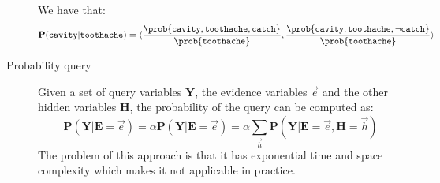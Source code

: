 \begin{description}
\begin{example}
            We have that:
            \[
                \textbf{P}(\texttt{cavity} \vert \texttt{toothache}) = 
                    \langle 
                        \frac{\prob{\texttt{cavity}, \texttt{toothache}, \texttt{catch}}}{\prob{\texttt{toothache}}},
                        \frac{\prob{\texttt{cavity}, \texttt{toothache}, \lnot\texttt{catch}}}{\prob{\texttt{toothache}}}
                    \rangle  
            \]
        \end{example}

    \item[Probability query] 
        Given a set of query variables $\bm{Y}$, the evidence variables $\vec{e}$ and the other hidden variables $\bm{H}$,
        the probability of the query can be computed as:
        \[ 
            \textbf{P}(\bm{Y} \vert \bm{E}=\vec{e}) = \alpha \textbf{P}(\bm{Y} \vert \bm{E}=\vec{e})
                = \alpha \sum_{\vec{h}} \textbf{P}(\bm{Y} \vert \bm{E}=\vec{e}, \bm{H}=\vec{h})
        \]
        The problem of this approach is that it has exponential time and space complexity
        which makes it not applicable in practice.
\end{description}
